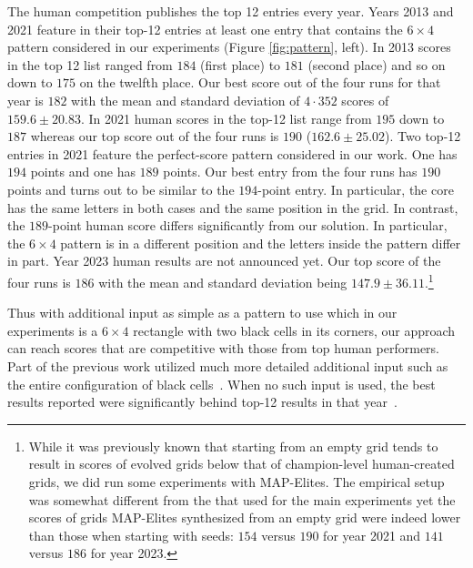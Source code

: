 The human competition publishes the top 12 entries every year. Years 2013 and 2021 feature in their top-12 entries at least one entry that contains the $6 \times 4$ pattern considered in our experiments (Figure \ref{fig:pattern}, left). In 2013 scores in the top 12 list ranged from $184$ (first place) to $181$ (second place) and so on down to $175$ on the twelfth place. Our best score out of the four runs for that year is $182$  with the mean and standard deviation of $4 \cdot 352$ scores of $159.6  \pm 20.83$. In 2021 human scores in the top-12 list range from $195$ down to $187$ whereas our top score out of the four runs is $190$ ($162.6 \pm 25.02$). Two top-12 entries in 2021 feature the perfect-score pattern considered in our work. One has $194$ points and one has $189$ points. Our best entry from the four runs has $190$ points and turns out to be similar to the $194$-point entry. In particular, the core has the same letters in both cases and the same position in the grid. In contrast, the $189$-point human score differs significantly from our solution. In particular, the $6 \times 4$ pattern is in a different position and the letters inside the pattern differ in part. Year 2023 human results are not announced yet. Our top score of the four runs is $186$ with the mean and standard deviation being $147.9 \pm 36.11$.\footnote{While it was previously known that starting from an empty grid tends to result in scores of evolved grids below that of champion-level human-created grids, we did run some experiments with MAP-Elites. The empirical setup was somewhat different from the that used for the main experiments yet the scores of grids MAP-Elites synthesized from an empty grid were indeed lower than those when starting with seeds: $154$ versus $190$ for year 2021 and $141$ versus $186$ for year 2023.}

Thus with additional input as simple as a pattern to use which in our experiments is a $6 \times 4$ rectangle with two black cells in its corners, our approach can reach scores that are competitive with those from top human performers. Part of the previous work utilized much more detailed additional input such as the entire configuration of black cells~\cite{DBLP:conf/socs/BoteaB21}. When no such input is used, the best results reported were significantly behind top-12 results in that
year~\cite{DBLP:conf/cig/BulitkoB21,Botea_Bulitko_2022}.




